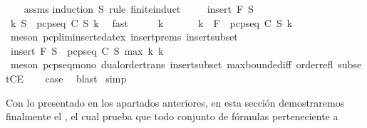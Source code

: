 \begin{isabellebody}
%
\isadelimproof
\ \ %
\endisadelimproof
%
\isatagproof
{}\isamarkupfalse%
\ assms\isanewline
{}\isamarkupfalse%
{\isacharparenleft}induction\ S{\isacharprime}\ rule{\isacharcolon}\ finite{\isacharunderscore}induct{\isacharparenright}\ \isanewline
\ \ \isamarkupfalse%
\ {\isacharparenleft}insert\ F\ S{\isacharprime}{\isacharparenright}\isanewline
\ \ \isamarkupfalse%
\ {\isachardoublequoteopen}{\isasymexists}k{\isachardot}\ S{\isacharprime}\ {\isasymsubseteq}\ pcp{\isacharunderscore}seq\ C\ S\ k{\isachardoublequoteclose}\ \isamarkupfalse%
\ fast\isanewline
\ \ \isamarkupfalse%
\ \isamarkupfalse%
\ k{}\ \isacommand{{\isachardot}{\isachardot}}\isamarkupfalse%
\isanewline
\ \ \isamarkupfalse%
\ \isamarkupfalse%
\ k{}\ \ {\isachardoublequoteopen}F\ {\isasymin}\ pcp{\isacharunderscore}seq\ C\ S\ k{}{\isachardoublequoteclose}\isanewline
\ \ \ \ \isamarkupfalse%
\ {\isacharparenleft}meson\ pcp{\isacharunderscore}lim{\isacharunderscore}inserted{\isacharunderscore}at{\isacharunderscore}ex\ insert{\isachardot}prems\ insert{\isacharunderscore}subset{\isacharparenright}\isanewline
\ \ \isamarkupfalse%
\ \isamarkupfalse%
\ {\isachardoublequoteopen}insert\ F\ S{\isacharprime}\ {\isasymsubseteq}\ pcp{\isacharunderscore}seq\ C\ S\ {\isacharparenleft}max\ k{}\ k{}{\isacharparenright}{\isachardoublequoteclose}\isanewline
\ \ \ \ \isamarkupfalse%
\ {\isacharparenleft}meson\ pcp{\isacharunderscore}seq{\isacharunderscore}mono\ dual{\isacharunderscore}order{\isachardot}trans\ insert{\isacharunderscore}subset\ max{\isachardot}bounded{\isacharunderscore}iff\ order{\isacharunderscore}refl\ subsetCE{\isacharparenright}\isanewline
\ \ \isamarkupfalse%
\ {\isacharquery}case\ \isamarkupfalse%
\ blast\isanewline
{}\isamarkupfalse%
\ simp%
\endisatagproof
{\isafoldproof}%
%
\isadelimproof
%
\endisadelimproof
%
\isadelimdocument
%
\endisadelimdocument
%
\isatagdocument
%
\isamarkuptrue%
%
\endisatagdocument
{\isafolddocument}%
%
\isadelimdocument
%
\endisadelimdocument
%
\begin{isamarkuptext}%
Con lo presentado en los apartados anteriores, en esta sección demostraremos finalmente el 
  , el cual prueba que todo conjunto de fórmulas perteneciente a 

\end{isamarkuptext}
\end{isabellebody}

